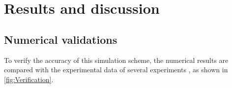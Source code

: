 %
% 
%


\section{Results and discussion}

\subsection{Numerical validations}
To verify the accuracy of this simulation scheme, the numerical results are compared with the experimental data of several experiments \cite{Zhang.Wu.ea_2022,Qu.Mudawar_2002,Yang.Wang.ea_2017}, as shown in \cref{fig:Verification}.
\begin{figure*}[htbp]
    \centering
    \scriptsize%

    \caption{Numerical validations.
        (a)Zhang et al. \cite{Zhang.Wu.ea_2022} of the microchannel heat sink at different mass flow rates for the variation of the bottom surface temperature of the microchannel heat sink.
        (b)Variation of inlet and outlet temperature difference and pressure drop in microchannels of Qu and Mudawar \cite{Qu.Mudawar_2002} at different Reynolds numbers.
        (c)Yang et al. \cite{Yang.Wang.ea_2017} of the pin-fin heat sink with the highest temperature on the bottom surface of the pin-fin heat sink for different pin-fin shapes.}
    \label{fig:Verification}
\end{figure*}

